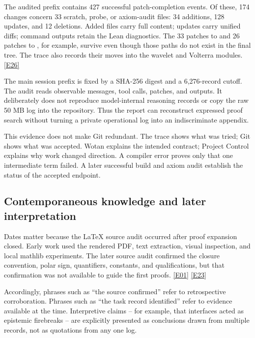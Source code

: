 \documentclass[11pt,a4paper]{article}
\newcommand{\artifact}[1]{\texttt{\detokenize{#1}}}
\newcommand{\ev}[1]{%
  \hyperref[ev:#1]{\textcolor{ReportBlue}{\textsf{\scriptsize[#1]}}}}
\begin{document}
The audited prefix contains 427 successful patch-completion events. Of these, 174
changes concern 33 scratch, probe, or axiom-audit files: 34 additions, 128 updates,
and 12 deletions. Added files carry full content; updates carry unified diffs; command
outputs retain the Lean diagnostics. The 33 patches to \artifact{ScratchT17.lean}
and 26 patches to \artifact{ScratchT18.lean}, for example, survive even though those
paths do not exist in the final tree. The trace also records their moves into the
wavelet and Volterra modules. \ev{E26}

\begin{evidencebox}
The main session prefix is fixed by a SHA-256 digest and a 6,276-record cutoff. The
audit reads observable messages, tool calls, patches, and outputs. It deliberately
does not reproduce model-internal reasoning records or copy the raw 50 MB log into
the repository. Thus the report can reconstruct expressed proof search without
turning a private operational log into an indiscriminate appendix.
\end{evidencebox}

This evidence does not make Git redundant. The trace shows what was tried; Git shows
what was accepted. Wotan explains the intended contract; Project Control explains
why work changed direction. A compiler error proves only that one intermediate term
failed. A later successful build and axiom audit establish the status of the accepted
endpoint.

\subsection{Contemporaneous knowledge and later interpretation}

Dates matter because the LaTeX source audit occurred after proof expansion closed.
Early work used the rendered PDF, text extraction, visual inspection, and local
mathlib experiments. The later source audit confirmed the closure convention,
polar sign, quantifiers, constants, and qualifications, but that confirmation was not
available to guide the first proofs. \ev{E01}\ev{E23}

Accordingly, phrases such as ``the source confirmed'' refer to retrospective
corroboration. Phrases such as ``the task record identified'' refer to evidence
available at the time. Interpretive claims -- for example, that interfaces acted as
epistemic firebreaks -- are explicitly presented as conclusions drawn from multiple
records, not as quotations from any one log.
\end{document}
